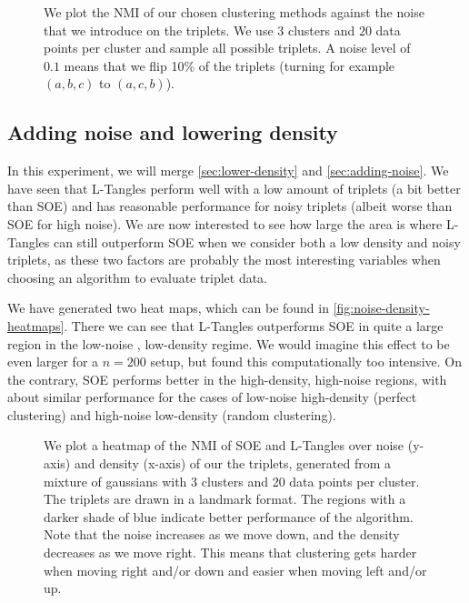 \begin{figure}[ht]
    \centering
    \resizebox{0.7\textwidth}{!}{}
    \caption{
        We plot the NMI of our chosen clustering methods against the noise that we introduce on 
        the triplets.
        We use $3$ clusters and $20$ data points per cluster and sample all possible triplets. A noise level of $0.1$ means that we flip 10\% of the triplets (turning for example $(a,b,c)$ to $(a,c,b)$). 
    }
    \label{fig:adding-noise}
\end{figure}

\subsection{Adding noise and lowering density}
In this experiment, we will merge \autoref{sec:lower-density} and \autoref{sec:adding-noise}. We have seen that L-Tangles perform well with a low
amount of triplets (a bit better than SOE) and has reasonable performance for noisy triplets (albeit worse than SOE for high noise). We are now interested to see how large the area is
where L-Tangles can still outperform SOE when we consider both a low density and noisy triplets, as these two factors are probably the most interesting variables
when choosing an algorithm to evaluate triplet data. 

We have generated two heat maps, which can be found in \autoref{fig:noise-density-heatmaps}. 
There we can see that L-Tangles outperforms SOE in quite a large region in the low-noise , low-density regime. We would imagine this effect to be even larger
for a $n=200$ setup, but found this computationally too intensive. On the contrary, SOE performs better in the high-density, high-noise regions, with about similar performance
for the cases of low-noise high-density (perfect clustering) and high-noise low-density (random clustering).

\onecolumn
\begin{figure}[ht]
    \centering
    \caption{
        We plot a heatmap of the NMI of SOE and L-Tangles over noise (y-axis) and density (x-axis) of our the triplets, generated from a mixture of gaussians with 3 clusters and 20 data points per cluster. The triplets are drawn in a landmark format. 
        The regions with a darker shade of blue indicate better performance of the algorithm. 
        Note that the noise increases as we move down, and the
        density decreases as we move right. This means that clustering gets harder when moving right and/or down and easier when moving left and/or up.
    }
    \label{fig:noise-density-heatmaps}
\end{figure}

